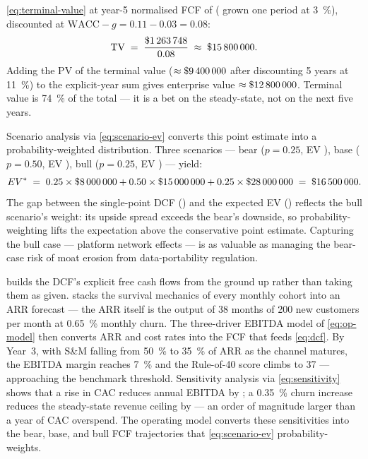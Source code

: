 \begin{example}
\cref{eq:terminal-value} at year-5 normalised FCF of  (
grown one period at \qty{3}{\percent}), discounted at \(\mathrm{WACC}-g = 0.11-0.03 = 0.08\):
\[
  \mathrm{TV} \;=\; \frac{\$\num{1263748}}{0.08} \;\approx\; \$\num{15800000}.
\]
Adding the PV of the terminal value (\(\approx\$\num{9400000}\) after discounting 5 years
at \qty{11}{\percent}) to the explicit-year sum gives enterprise value
\(\approx\$\num{12800000}\). Terminal value is \qty{74}{\percent} of the total --- it is
a bet on the steady-state, not on the next five years.
\end{example}

Scenario analysis via \cref{eq:scenario-ev} converts this point estimate into a probability-weighted
distribution. Three scenarios --- bear (\(p=0.25\), EV ), base (\(p=0.50\),
EV ), bull (\(p=0.25\), EV ) --- yield:
\[
  EV^* \;=\; 0.25\times\$\num{8000000}
           + 0.50\times\$\num{15000000}
           + 0.25\times\$\num{28000000}
         \;=\; \$\num{16500000}.
\]
The  gap between the single-point DCF () and the expected EV
() reflects the bull scenario's weight: its upside spread exceeds the bear's
downside, so probability-weighting lifts the expectation above the conservative point estimate.
Capturing the bull case --- platform network effects --- is as valuable as managing the
bear-case risk of moat erosion from data-portability regulation.

 builds the DCF's explicit free cash flows from the ground up rather
than taking them as given.  stacks the survival mechanics of every
monthly cohort into an ARR forecast --- the  ARR itself is the output of 38
months of \num{200} new customers per month at \qty{0.65}{\percent} monthly churn. The
three-driver EBITDA model of \cref{eq:op-model} then converts ARR and cost rates into the FCF
that feeds \cref{eq:dcf}. By Year~3, with S\&M falling from \qty{50}{\percent} to
\qty{35}{\percent} of ARR as the channel matures, the EBITDA margin reaches \qty{+7}{\percent}
and the Rule-of-40 score climbs to 37 --- approaching the benchmark threshold. Sensitivity
analysis via \cref{eq:sensitivity} shows that a  rise in CAC reduces annual EBITDA
by ; a \qty{0.35}{\percent} churn increase reduces the steady-state revenue
ceiling by  --- an order of magnitude larger than a year of CAC overspend.
The operating model converts these sensitivities into the bear, base, and bull FCF trajectories
that \cref{eq:scenario-ev} probability-weights.

